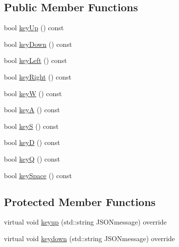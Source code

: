 \subsection*{Public Member Functions}
\begin{DoxyCompactItemize}
\item 
bool \hyperlink{classbridges_1_1game_1_1_input_helper_aaa62faebd9e874228b710bb2a57cba2b}{key\+Up} () const
\item 
bool \hyperlink{classbridges_1_1game_1_1_input_helper_a904f5f5d2c6408bcd447044555cd376d}{key\+Down} () const
\item 
bool \hyperlink{classbridges_1_1game_1_1_input_helper_a9e98e137e69ef8b2f92e587092c42af4}{key\+Left} () const
\item 
bool \hyperlink{classbridges_1_1game_1_1_input_helper_a265fb9bd88d66e5439dd791bb90c79a4}{key\+Right} () const
\item 
bool \hyperlink{classbridges_1_1game_1_1_input_helper_a97a204c00019b28b4e95dde0b757a1aa}{keyW} () const
\item 
bool \hyperlink{classbridges_1_1game_1_1_input_helper_a168770e762b33e32597f9f7294082d9b}{keyA} () const
\item 
bool \hyperlink{classbridges_1_1game_1_1_input_helper_aa141b96b3406e66feab876185c7f350e}{keyS} () const
\item 
bool \hyperlink{classbridges_1_1game_1_1_input_helper_af7247d84254d706e3a309db2f4c20e9b}{keyD} () const
\item 
bool \hyperlink{classbridges_1_1game_1_1_input_helper_acef5fda1a5679e811fdf5a669dc65f9f}{keyQ} () const
\item 
bool \hyperlink{classbridges_1_1game_1_1_input_helper_a1750cd9c59e18126c251ec468fc87d48}{key\+Space} () const
\end{DoxyCompactItemize}
\subsection*{Protected Member Functions}
\begin{DoxyCompactItemize}
\item 
virtual void \hyperlink{classbridges_1_1game_1_1_input_helper_aa847f19c6f68ebbb63d73802abfcd9a0}{keyup} (std\+::string J\+S\+O\+Nmessage) override
\item 
virtual void \hyperlink{classbridges_1_1game_1_1_input_helper_aac75c2b1abf28afa4acaf730e925f301}{keydown} (std\+::string J\+S\+O\+Nmessage) override
\end{DoxyCompactItemize}


